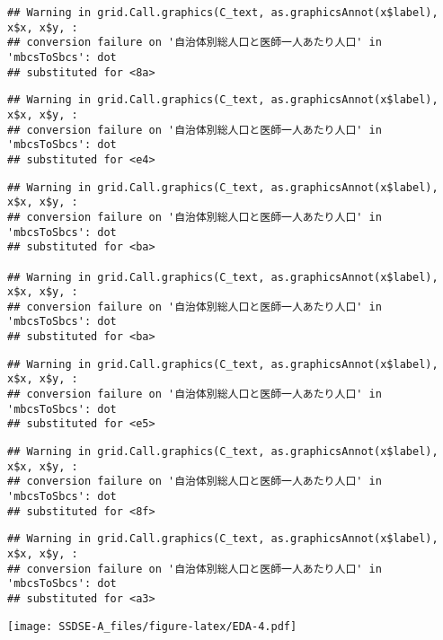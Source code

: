 \documentclass[
]{article}
\begin{document}
\begin{verbatim}
## Warning in grid.Call.graphics(C_text, as.graphicsAnnot(x$label), x$x, x$y, :
## conversion failure on '自治体別総人口と医師一人あたり人口' in 'mbcsToSbcs': dot
## substituted for <8a>
\end{verbatim}

\begin{verbatim}
## Warning in grid.Call.graphics(C_text, as.graphicsAnnot(x$label), x$x, x$y, :
## conversion failure on '自治体別総人口と医師一人あたり人口' in 'mbcsToSbcs': dot
## substituted for <e4>
\end{verbatim}

\begin{verbatim}
## Warning in grid.Call.graphics(C_text, as.graphicsAnnot(x$label), x$x, x$y, :
## conversion failure on '自治体別総人口と医師一人あたり人口' in 'mbcsToSbcs': dot
## substituted for <ba>

## Warning in grid.Call.graphics(C_text, as.graphicsAnnot(x$label), x$x, x$y, :
## conversion failure on '自治体別総人口と医師一人あたり人口' in 'mbcsToSbcs': dot
## substituted for <ba>
\end{verbatim}

\begin{verbatim}
## Warning in grid.Call.graphics(C_text, as.graphicsAnnot(x$label), x$x, x$y, :
## conversion failure on '自治体別総人口と医師一人あたり人口' in 'mbcsToSbcs': dot
## substituted for <e5>
\end{verbatim}

\begin{verbatim}
## Warning in grid.Call.graphics(C_text, as.graphicsAnnot(x$label), x$x, x$y, :
## conversion failure on '自治体別総人口と医師一人あたり人口' in 'mbcsToSbcs': dot
## substituted for <8f>
\end{verbatim}

\begin{verbatim}
## Warning in grid.Call.graphics(C_text, as.graphicsAnnot(x$label), x$x, x$y, :
## conversion failure on '自治体別総人口と医師一人あたり人口' in 'mbcsToSbcs': dot
## substituted for <a3>
\end{verbatim}

\texttt{[image: SSDSE-A\_files/figure-latex/EDA-4.pdf]}
\end{document}
